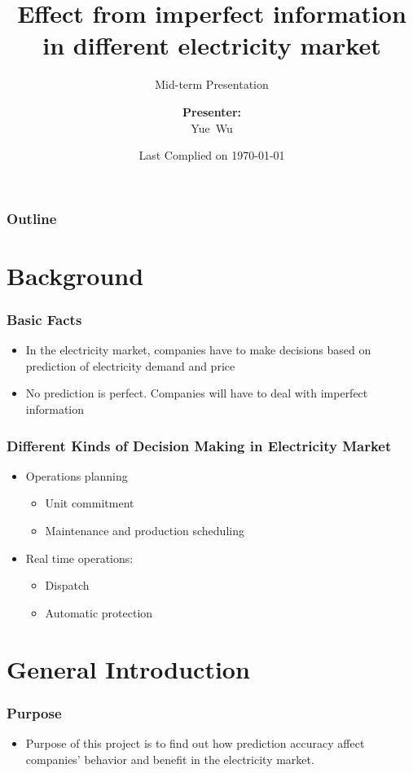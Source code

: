\documentclass[compress,handout,10pt]{beamer}
\title{{\color{blue} \LARGE Effect from imperfect information in different electricity market\newline} }
\subtitle{{\color{red} \large Mid-term Presentation} }
\author{ 
    {\bf{Presenter:}} \\ 
Yue~Wu \\ 
    \vspace{5pt}
}
\institute{JHU AMS 2012 FALL}
\date{\mygreen Last Complied on \today}
\let\olditem\item
\renewcommand{\item}{\setlength{\itemsep}{0.5\baselineskip}\olditem}
\begin{document}
\begin{frame}[plain]
    \titlepage
\end{frame}

\begin{frame}
    \frametitle{Outline}
    \tableofcontents
\end{frame}

\section{Background}

\begin{frame}
    \frametitle{Basic Facts}
   
    \vspace{7pt}


             \begin{itemize}
                 \item In the electricity market, companies have to make decisions based on prediction of electricity demand and price
                 \item No prediction is perfect. Companies will have to deal with imperfect information
                
             \end{itemize}


\end{frame}

\begin{frame}
    \frametitle{Different Kinds of Decision Making in Electricity Market}
\begin{itemize}
                 \item Operations planning
              \begin{itemize}
                 \item Unit commitment
                 \item Maintenance and production scheduling
               \end{itemize}
                 \item Real time operations:
              \begin{itemize}
                 \item Dispatch
                 \item Automatic protection
               \end{itemize}
             \end{itemize}
\end{frame}

\section{General Introduction}
\begin{frame}
    \frametitle{Purpose}
     \begin{itemize}
     \item Purpose of this project is to find out how prediction accuracy affect companies' behavior and benefit in the electricity market.
     \end{itemize}
\end{frame}
\end{document}
